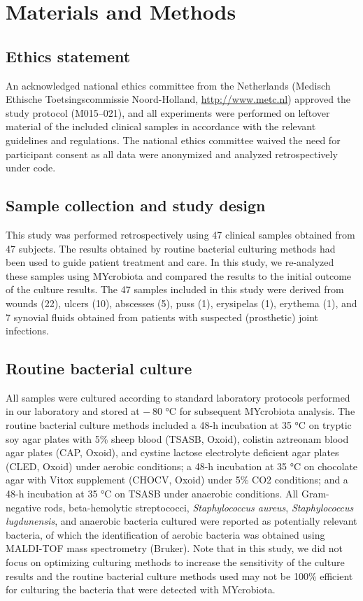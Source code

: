 \section*{Materials and Methods}

\subsection*{Ethics statement}

An acknowledged national ethics committee from the Netherlands (Medisch Ethische Toetsingscommissie Noord-Holland, \url{http://www.metc.nl})
approved the study protocol (M015–021), and all experiments were performed on leftover material of the included clinical samples in
accordance with the relevant guidelines and regulations. The national ethics committee waived the need for participant consent as all
data were anonymized and analyzed retrospectively under code.

\subsection*{Sample collection and study design}

This study was performed retrospectively using 47 clinical samples obtained from 47 subjects. The results obtained by routine bacterial
culturing methods had been used to guide patient treatment and care. In this study, we re-analyzed these samples using MYcrobiota and
compared the results to the initial outcome of the culture results. The 47 samples included in this study were derived from wounds (22),
ulcers (10), abscesses (5), puss (1), erysipelas (1), erythema (1), and 7 synovial fluids obtained from patients with suspected (prosthetic)
joint infections.

\subsection*{Routine bacterial culture}

All samples were cultured according to standard laboratory protocols performed in our laboratory and stored at − 80 °C for subsequent MYcrobiota
analysis. The routine bacterial culture methods included a 48-h incubation at 35 °C on tryptic soy agar plates with 5\% sheep blood (TSASB, Oxoid),
colistin aztreonam blood agar plates (CAP, Oxoid), and cystine lactose electrolyte deficient agar plates (CLED, Oxoid) under aerobic conditions;
a 48-h incubation at 35 °C on chocolate agar with Vitox supplement (CHOCV, Oxoid) under 5\% CO2 conditions; and a 48-h incubation at 35 °C on
TSASB under anaerobic conditions. All Gram-negative rods, beta-hemolytic streptococci, \textit{Staphylococcus aureus}, \textit{Staphylococcus lugdunensis}, and
anaerobic bacteria cultured were reported as potentially relevant bacteria, of which the identification of aerobic bacteria was obtained using
MALDI-TOF mass spectrometry (Bruker). Note that in this study, we did not focus on optimizing culturing methods to increase the sensitivity
of the culture results and the routine bacterial culture methods used may not be 100\% efficient for culturing the bacteria that were detected
with MYcrobiota.


